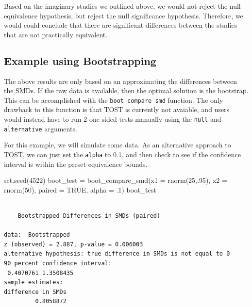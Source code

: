 \documentclass[
]{interact}
\newenvironment{Shaded}{\begin{snugshade}}{\end{snugshade}}
\newcommand{\AttributeTok}[1]{\textcolor[rgb]{0.40,0.45,0.13}{#1}}
\newcommand{\ConstantTok}[1]{\textcolor[rgb]{0.56,0.35,0.01}{#1}}
\newcommand{\DecValTok}[1]{\textcolor[rgb]{0.68,0.00,0.00}{#1}}
\newcommand{\FunctionTok}[1]{\textcolor[rgb]{0.28,0.35,0.67}{#1}}
\newcommand{\NormalTok}[1]{\textcolor[rgb]{0.00,0.23,0.31}{#1}}
\newcommand{\OtherTok}[1]{\textcolor[rgb]{0.00,0.23,0.31}{#1}}
\begin{document}
Based on the imaginary studies we outlined above, we would not reject
the null equivalence hypothesis, but reject the null significance
hypothesis. Therefore, we would could conclude that there are
significant differences between the studies that are not practically
equivalent.

\hypertarget{example-using-bootstrapping}{%
\subsection{Example using
Bootstrapping}\label{example-using-bootstrapping}}

The above results are only based on an approximating the differences
between the SMDs. If the raw data is available, then the optimal
solution is the bootstrap. This can be accomplished with the
\texttt{boot\_compare\_smd} function. The only drawback to this function
is that TOST is currently not avaiable, and users would instead have to
run 2 one-sided tests manually using the \texttt{null} and
\texttt{alternative} arguments.

For this example, we will simulate some data. As an alternative approach
to TOST, we can just set the \texttt{alpha} to 0.1, and then check to
see if the confidence interval is within the preset equivalence bounds.

\begin{Shaded}
\begin{Highlighting}[]
\FunctionTok{set.seed}\NormalTok{(}\DecValTok{4522}\NormalTok{)}
\NormalTok{boot\_test }\OtherTok{=} \FunctionTok{boot\_compare\_smd}\NormalTok{(}\AttributeTok{x1 =} \FunctionTok{rnorm}\NormalTok{(}\DecValTok{25}\NormalTok{,.}\DecValTok{95}\NormalTok{), }\AttributeTok{x2 =} \FunctionTok{rnorm}\NormalTok{(}\DecValTok{50}\NormalTok{), }
                             \AttributeTok{paired =} \ConstantTok{TRUE}\NormalTok{, }\AttributeTok{alpha =}\NormalTok{ .}\DecValTok{1}\NormalTok{)}
\NormalTok{boot\_test}
\end{Highlighting}
\end{Shaded}

\begin{verbatim}

    Bootstrapped Differences in SMDs (paired)

data:  Bootstrapped
z (observed) = 2.887, p-value = 0.006003
alternative hypothesis: true difference in SMDs is not equal to 0
90 percent confidence interval:
 0.4070761 1.3508435
sample estimates:
difference in SMDs 
         0.8058872 
\end{verbatim}
\end{document}
